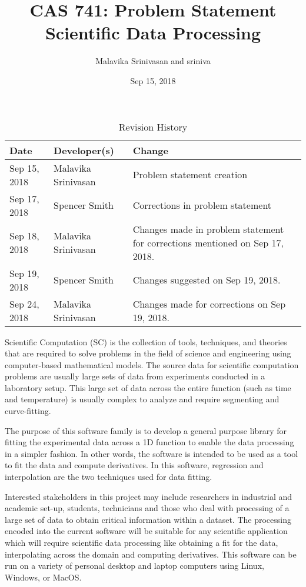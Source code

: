\documentclass{article}
\title{CAS 741: Problem Statement\\ Scientific Data Processing}
\author{Malavika Srinivasan and sriniva}
\date{Sep 15, 2018}
\begin{document}
\maketitle

\begin{table}[hp]
\caption{Revision History} \label{TblRevisionHistory}
\begin{tabularx}{\textwidth}{llX}
\toprule
\textbf{Date} & \textbf{Developer(s)} & \textbf{Change}\\
\midrule
Sep 15, 2018 & Malavika Srinivasan & Problem statement creation\\
Sep 17, 2018 & Spencer Smith & Corrections in problem statement\\
Sep 18, 2018 & Malavika Srinivasan & 
Changes made in problem statement for corrections mentioned on Sep 17, 2018.\\
Sep 19, 2018& Spencer Smith & Changes suggested on Sep 19, 2018. \\
Sep 24, 2018& Malavika Srinivasan & Changes made for corrections on Sep 19, 2018. \\
\bottomrule
\end{tabularx}
\end{table}

Scientific Computation (SC) is the collection of tools, techniques, and theories that are required to solve problems in the field of science and engineering using computer-based mathematical models. The source data for scientific computation problems are usually large sets of data from experiments conducted in a laboratory setup. This large set of data across the entire function (such as time and temperature) is usually complex to analyze and require segmenting and curve-fitting.

The purpose of this software family is to  develop a general purpose library for fitting the experimental data across a 1D function to enable the data processing in a simpler fashion. In other words, the software is intended to be used as a tool to fit the data and compute derivatives. In this software, regression and interpolation are the two techniques used for data fitting.

Interested stakeholders in this project may include researchers in industrial and academic set-up, students, technicians and those who deal with processing of a large set of data to obtain critical information within a dataset. The processing encoded into the current software will be suitable for any scientific application which will require scientific data processing like obtaining a fit for the data, interpolating across the domain and computing derivatives. This software can be run on a variety of personal desktop and laptop computers using Linux, Windows, or MacOS.





\end{document}
